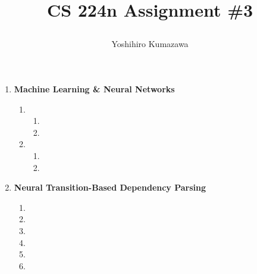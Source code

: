 \documentclass[12pt, dvipdfmx]{article}
\title{
  \vspace{-2cm}
  CS 224n Assignment \#3 \\
  \author{Yoshihiro Kumazawa}
}
\begin{document}
\maketitle
\begin{enumerate}[label=\textbf{\arabic*.}]
\item \textbf{Machine Learning \& Neural Networks}
\begin{enumerate}[label=(\alph*)]
\item
\begin{enumerate}[label=\roman*.]
\item
\item
\end{enumerate}
\item
\begin{enumerate}[label=\roman*.]
\item
\item
\end{enumerate}
\end{enumerate}
\item \textbf{Neural Transition-Based Dependency Parsing}
\begin{enumerate}[label=(\alph*)]
\item
\item
\item
\item
\item
\item
\end{enumerate}
\end{enumerate}
\end{document}
